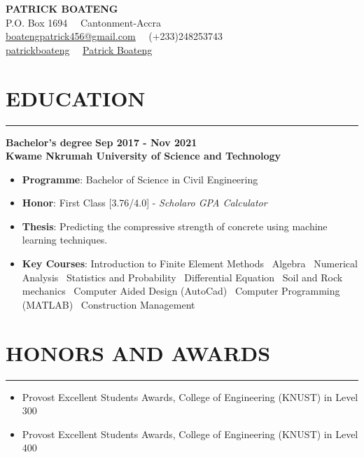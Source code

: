 \documentclass[letterpaper, 12pt]{article}
\newcommand{\cvsection}[1]{
	
	\section*{#1}	
	\rule[20pt]{\linewidth}{0.5pt} %

}
\newcommand{\verticalSpace}{4pt}
\newcommand{\itemizeMargin}{11pt}
\begin{document}
	
	
	\begin{center}
		
	{\huge{\textbf{PATRICK BOATENG}}} \\ [\verticalSpace]
	
	P.O. Box 1694 \, \vrule \, Cantonment-Accra \\ [\verticalSpace]
	
	\faEnvelope \space \href{mailto:boatengpatrick456@gmail.com}{\underline{boatengpatrick456@gmail.com}}
	\, \vrule \,
	\faPhone \space (+233)248253743 \\ [\verticalSpace]
	\faGithub \space \href{https://www.github.com/patrick}{\underline{patrickboateng}}
	\, \vrule \,
	\faLinkedin \space \href{https://www.linkedin.com/in/patrickboateng}{\underline{Patrick Boateng}}
	
	\end{center}
	
	
	\cvsection{EDUCATION} 	
	
	\textbf{Bachelor's degree} \hfill \textbf{Sep 2017 - Nov 2021} \\ [\verticalSpace]
	\textbf{Kwame Nkrumah University of Science and Technology}
	
	\begin{itemize}[leftmargin=\itemizeMargin]
		
		\item \textbf{Programme}: Bachelor of Science in Civil Engineering
		\item \textbf{Honor}: First Class [3.76/4.0] - \textit{Scholaro GPA Calculator}
		\item \textbf{Thesis}: Predicting the compressive strength of concrete using machine learning techniques.
		\item \textbf{Key Courses}: Introduction to Finite Element Methods \vrule \, Algebra \vrule \, Numerical Analysis \vrule \, Statistics and Probability \vrule \, Differential Equation \vrule \, Soil and Rock mechanics \vrule \, Computer Aided Design (AutoCad) \vrule \, Computer Programming (MATLAB) \vrule \, Construction Management
	
	\end{itemize}
	
	
	\cvsection{HONORS AND AWARDS}
	
	\begin{itemize}[leftmargin=\itemizeMargin, before=\vspace{-\baselineskip}]
		
		\item Provost Excellent Students Awards, College of Engineering (KNUST) in Level 300
		\item Provost Excellent Students Awards, College of Engineering (KNUST) in Level 400
		
	\end{itemize}
	
\end{document}
